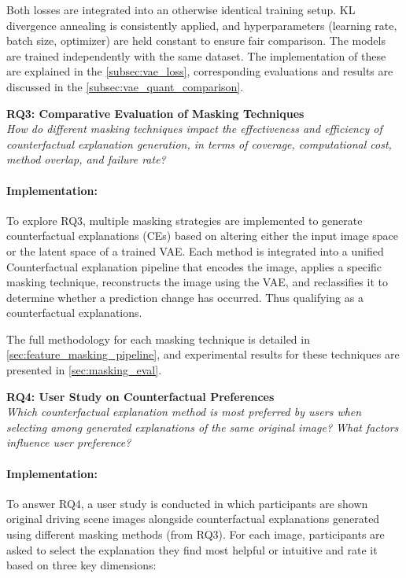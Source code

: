 Both losses are integrated into an otherwise identical training setup. KL divergence annealing is consistently applied, and hyperparameters (learning rate, batch size, optimizer) are held constant to ensure fair comparison. The models are trained independently with the same dataset. The implementation of these are explained in the \cref{subsec:vae_loss}, corresponding evaluations and results are discussed in the \cref{subsec:vae_quant_comparison}.


\vspace{1em}

\textbf{RQ3: Comparative Evaluation of Masking Techniques} \\
\textit{How do different masking techniques impact the effectiveness and efficiency of counterfactual explanation generation, in terms of coverage, computational cost, method overlap, and failure rate?}

\vspace{-1em}

\paragraph{Implementation:}To explore RQ3, multiple masking strategies are implemented to generate counterfactual explanations (CEs) based on altering either the input image space or the latent space of a trained VAE. Each method is integrated into a unified Counterfactual explanation pipeline that encodes the image, applies a specific masking technique, reconstructs the image using the VAE, and reclassifies it to determine whether a prediction change has occurred. Thus qualifying as a counterfactual explanations.


The full methodology for each masking technique is detailed in \cref{sec:feature_masking_pipeline}, and experimental results for these techniques are presented in \cref{sec:masking_eval}.

\vspace{1em}

\textbf{RQ4: User Study on Counterfactual Preferences}  \\
\textit{Which counterfactual explanation method is most preferred by users when selecting among generated explanations of the same original image? What factors influence user preference?}

\vspace{-1em}

\paragraph{Implementation:}To answer RQ4, a user study is conducted in which participants are shown original driving scene images alongside counterfactual explanations generated using different masking methods (from RQ3). For each image, participants are asked to select the explanation they find most helpful or intuitive and rate it based on three key dimensions:

